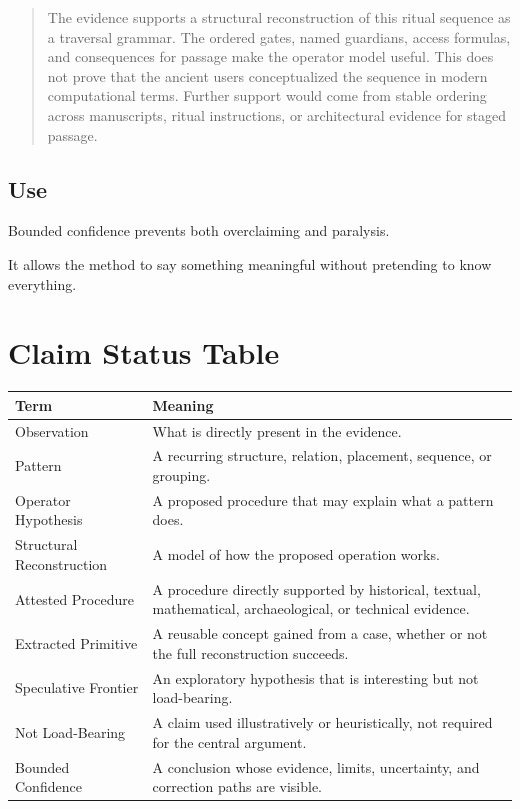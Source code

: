 \documentclass[11pt]{book}
\begin{document}
\begin{quote}
The evidence supports a structural reconstruction of this ritual sequence as a traversal grammar. The ordered gates, named guardians, access formulas, and consequences for passage make the operator model useful. This does not prove that the ancient users conceptualized the sequence in modern computational terms. Further support would come from stable ordering across manuscripts, ritual instructions, or architectural evidence for staged passage.
\end{quote}

\subsection{Use}

Bounded confidence prevents both overclaiming and paralysis.

It allows the method to say something meaningful without pretending to know everything.

\section{Claim Status Table}

\begin{center}
\begin{tabular}{p{} p{}}
\hline
\textbf{Term} & \textbf{Meaning} \\
\hline
Observation & What is directly present in the evidence. \\
Pattern & A recurring structure, relation, placement, sequence, or grouping. \\
Operator Hypothesis & A proposed procedure that may explain what a pattern does. \\
Structural Reconstruction & A model of how the proposed operation works. \\
Attested Procedure & A procedure directly supported by historical, textual, mathematical, archaeological, or technical evidence. \\
Extracted Primitive & A reusable concept gained from a case, whether or not the full reconstruction succeeds. \\
Speculative Frontier & An exploratory hypothesis that is interesting but not load-bearing. \\
Not Load-Bearing & A claim used illustratively or heuristically, not required for the central argument. \\
Bounded Confidence & A conclusion whose evidence, limits, uncertainty, and correction paths are visible. \\
\hline
\end{tabular}
\end{center}
\end{document}
